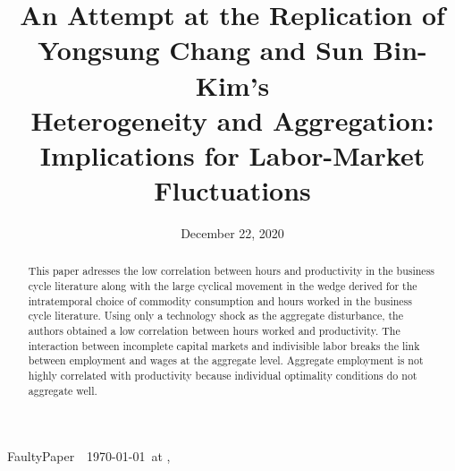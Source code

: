 \documentclass[titlepage,letterpaper]{\econtex}
\providecommand{\texname}{FaultyPaper}
\providecommand{\versn}{}
\begin{document}


\hfill{\tiny \texname~\versn~\today~{at} \DTMcurrenttime, ~~}

\title{An Attempt at the Replication of \\ Yongsung Chang and Sun Bin-Kim's \\ Heterogeneity and Aggregation: \\ Implications for Labor-Market Fluctuations}

\newlength\TableWidth


\date{December 22, 2020}
\maketitle




\hypertarget{Abstract}{}
\begin{abstract}
This paper adresses the low correlation between hours and productivity in the business cycle literature along with the large cyclical movement in the wedge derived for the intratemporal choice of commodity consumption and hours worked in the business cycle literature. Using only a technology shock as the aggregate disturbance, the authors obtained a low correlation between hours worked and productivity. The interaction between incomplete capital markets and indivisible labor breaks the link between employment and wages at the aggregate level. Aggregate employment is not highly correlated with productivity because individual optimality conditions do not aggregate well.
\end{abstract}
\end{document}
